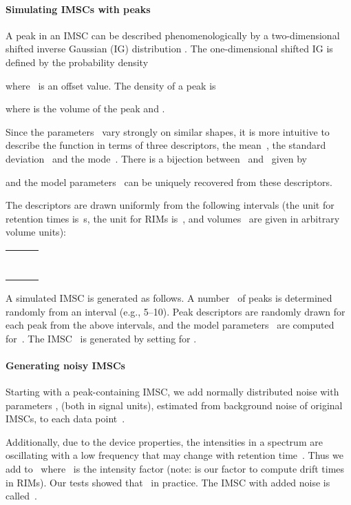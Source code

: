 \documentclass{article}
\begin{document}
\paragraph{Simulating IMSCs with peaks}
A peak in an IMSC can be described phenomenologically by a two-dimensional shifted inverse Gaussian (IG) distribution \citep{Kopczynski/etal/2012a}.
The one-dimensional shifted IG is defined by the probability density

where~ is an offset value.
The density of a peak is

where  is the volume of the peak and .

Since the parameters~ vary strongly on similar shapes, it is more intuitive to describe the function in terms of three descriptors, the mean~, the standard deviation~ and the mode~.
There is a bijection between~ and~ given by

and the model parameters~ can be uniquely recovered from these descriptors.

The descriptors are drawn uniformly from the following intervals (the unit for retention times is~s, the unit for RIMs is~, and volumes~ are given in arbitrary volume units):
\begin{center}\begin{tabular}{r@{ }c@{ }l}
 &  & \\
 &  & \\
 &  & \\
 &  &  \\
 &&  \\
 &  & \\
 &  & \\
\end{tabular}\end{center}



A simulated IMSC is generated as follows.
A number~ of peaks is determined randomly from an interval (e.g., 5--10).
Peak descriptors are randomly drawn for each peak from the above intervals, and the model parameters~ are computed for~.
The IMSC~ is generated by setting  for .

\paragraph{Generating noisy IMSCs}
Starting with a peak-containing IMSC, we add normally distributed noise with parameters ,  (both in signal units), estimated from background noise of original IMSCs, to each data point~.

Additionally, due to the device properties, the intensities in a spectrum are oscillating with a low frequency  that may change with retention time~.
Thus we add  to~ where~ is the intensity factor (note:  is our factor to compute drift times in RIMs).
Our tests showed that~ in practice.
The IMSC with added noise is called~.
\end{document}
